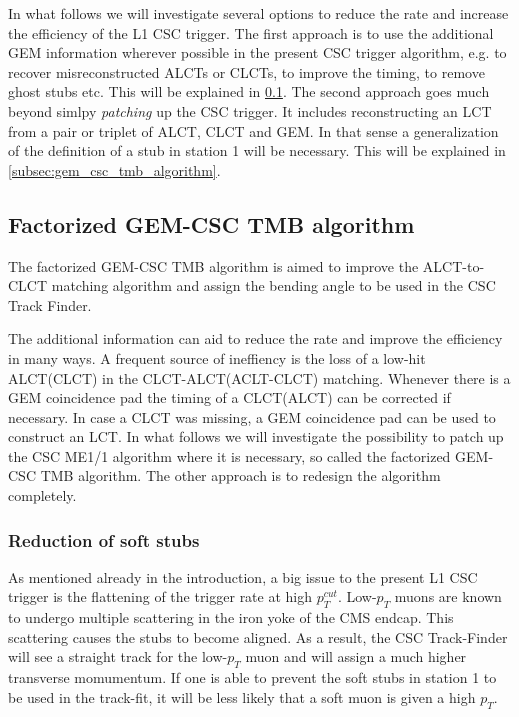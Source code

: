 In what follows we will investigate several options to reduce the rate and increase the efficiency of the L1 CSC trigger. The first approach is to use the additional GEM information wherever possible in the present CSC trigger algorithm, e.g. to recover misreconstructed ALCTs or CLCTs, to improve the timing, to remove ghost stubs etc. This will be explained in \ref{subsec:slhc_algorithm_with_gems}. The second approach goes much beyond simlpy \textit{patching} up the CSC trigger. It includes reconstructing an LCT from a pair or triplet of ALCT, CLCT and GEM. In that sense a generalization of the definition of a stub in station 1 will be necessary. This will be explained in \ref{subsec:gem_csc_tmb_algorithm}.  

\subsection{Factorized GEM-CSC TMB algorithm}
\label{subsec:slhc_algorithm_with_gems}

The factorized GEM-CSC TMB algorithm is aimed to improve the ALCT-to-CLCT matching algorithm and assign the bending angle to be used in the CSC Track Finder. 

The additional information can aid to reduce the rate and improve the efficiency in many ways. A frequent source of ineffiency is the loss of a low-hit ALCT(CLCT) in the CLCT-ALCT(ACLT-CLCT) matching. Whenever there is a GEM coincidence pad the timing of a CLCT(ALCT) can be corrected if necessary. In case a CLCT was missing, a GEM coincidence pad can be used to construct an LCT. In what follows we will investigate the possibility to patch up the CSC ME1/1 algorithm where it is necessary, so called the factorized GEM-CSC TMB algorithm. The other approach is to redesign the algorithm completely. 

\subsubsection{Reduction of soft stubs}
\label{subsubsec:reduction_of_soft_stubs}

As mentioned already in the introduction, a big issue to the present L1 CSC trigger is the flattening of the trigger rate at high $p_T^{cut}$. Low-$p_T$ muons are known to undergo multiple scattering in the iron yoke of the CMS endcap. This scattering causes the stubs to become aligned. As a result, the CSC Track-Finder will see a straight track for the low-$p_T$ muon and will assign a much higher transverse momumentum. If one is able to prevent the soft stubs in station 1 to be used in the track-fit, it will be less likely that a soft muon is given a high $p_T$. 

